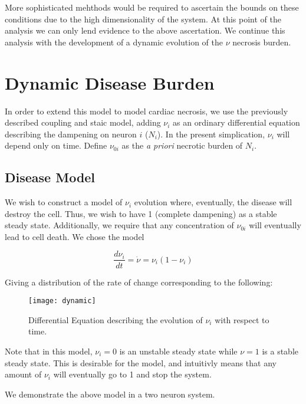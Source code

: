 \documentclass[11pt]{report}
\begin{document}
More sophisticated mehthods would be required to ascertain the bounds on these conditions due to the high dimensionality of the system. At this point of the analysis we can only lend evidence to the above ascertation. We continue this analysis with the development of a dynamic evolution of the $\nu$ necrosis burden. 



\section{Dynamic Disease Burden} %
\label{sub:dynamic_disease_burden}

In order to extend this model to model cardiac necrosis, we use the previously described coupling and staic model, adding $\nu_i$ as an ordinary differential equation describing the dampening on neuron $i$ ($N_i$). In the present simplication, $\nu_i$ will depend only on time. Define $\nu_{0i}$ as the \textit{a priori} necrotic burden of $N_i$. 

\subsection{Disease Model} %
\label{sub:disease_model}


We wish to construct a model of $\nu_{i}$ evolution where, eventually, the disease will destroy the cell. Thus, we wish to have 1 (complete dampening) as a stable steady state. Additionally, we require that any concentration of $\nu_{0i}$ will eventually lead to cell death. We chose the model

$$ \frac{d \nu_i}{dt} = \dot{\nu} = \nu_i (1 - \nu_i) $$

Giving a distribution of the rate of change corresponding to the following:

\begin{figure}[!ht]
  \caption{Differential Equation describing the evolution of $\nu_i$ with respect to time. }
  \centering
    \texttt{[image: dynamic]}
\end{figure}


Note that in this model, $\nu_i=0$ is an unstable steady state while $\nu=1$ is a stable steady state. This is desirable for the model, and intuitivly means that any amount of $\nu_i$ will eventually go to 1 and stop the system. 

We demonstrate the above model in a two neuron system.
\end{document}
